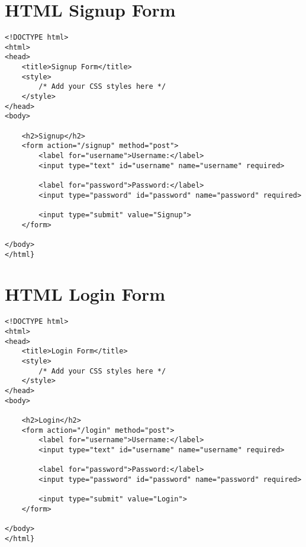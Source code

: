 \documentclass{article}
\begin{document}
\section{HTML Signup Form}

\begin{lstlisting}
<!DOCTYPE html>
<html>
<head>
    <title>Signup Form</title>
    <style>
        /* Add your CSS styles here */
    </style>
</head>
<body>

    <h2>Signup</h2>
    <form action="/signup" method="post">
        <label for="username">Username:</label>
        <input type="text" id="username" name="username" required>

        <label for="password">Password:</label>
        <input type="password" id="password" name="password" required>

        <input type="submit" value="Signup">
    </form>

</body>
</html}
\end{lstlisting}

\section{HTML Login Form}
\begin{lstlisting}
<!DOCTYPE html>
<html>
<head>
    <title>Login Form</title>
    <style>
        /* Add your CSS styles here */
    </style>
</head>
<body>

    <h2>Login</h2>
    <form action="/login" method="post">
        <label for="username">Username:</label>
        <input type="text" id="username" name="username" required>

        <label for="password">Password:</label>
        <input type="password" id="password" name="password" required>

        <input type="submit" value="Login">
    </form>

</body>
</html}
\end{lstlisting}
\end{document}

